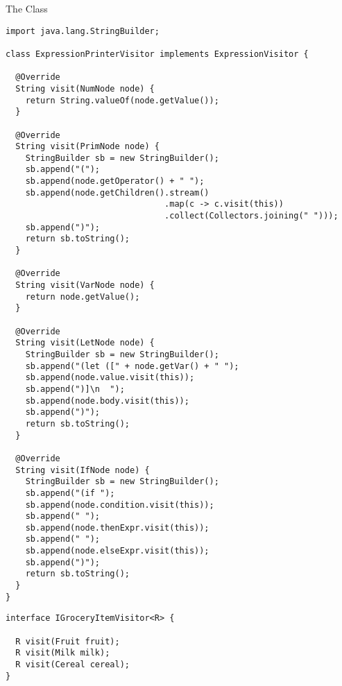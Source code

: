 \begin{cl}[]{The  Class}
\begin{lstlisting}[language=MyJava]
import java.lang.StringBuilder; 

class ExpressionPrinterVisitor implements ExpressionVisitor {

  @Override
  String visit(NumNode node) {
    return String.valueOf(node.getValue());
  }
  
  @Override
  String visit(PrimNode node) {
    StringBuilder sb = new StringBuilder();
    sb.append("(");
    sb.append(node.getOperator() + " ");
    sb.append(node.getChildren().stream()
                                .map(c -> c.visit(this))
                                .collect(Collectors.joining(" ")));
    sb.append(")");
    return sb.toString();
  }
  
  @Override
  String visit(VarNode node) {
    return node.getValue();
  }
  
  @Override
  String visit(LetNode node) {
    StringBuilder sb = new StringBuilder();
    sb.append("(let ([" + node.getVar() + " ");
    sb.append(node.value.visit(this));
    sb.append(")]\n  ");
    sb.append(node.body.visit(this));
    sb.append(")");
    return sb.toString();
  }
  
  @Override
  String visit(IfNode node) {
    StringBuilder sb = new StringBuilder();
    sb.append("(if ");
    sb.append(node.condition.visit(this));
    sb.append(" ");
    sb.append(node.thenExpr.visit(this));
    sb.append(" ");
    sb.append(node.elseExpr.visit(this));
    sb.append(")");
    return sb.toString();
  }
}
\end{lstlisting}
\end{cl}


\begin{cl}[]{}
\begin{lstlisting}[language=MyJava]
interface IGroceryItemVisitor<R> {

  R visit(Fruit fruit);
  R visit(Milk milk);
  R visit(Cereal cereal);
}
\end{lstlisting}
\end{cl}

